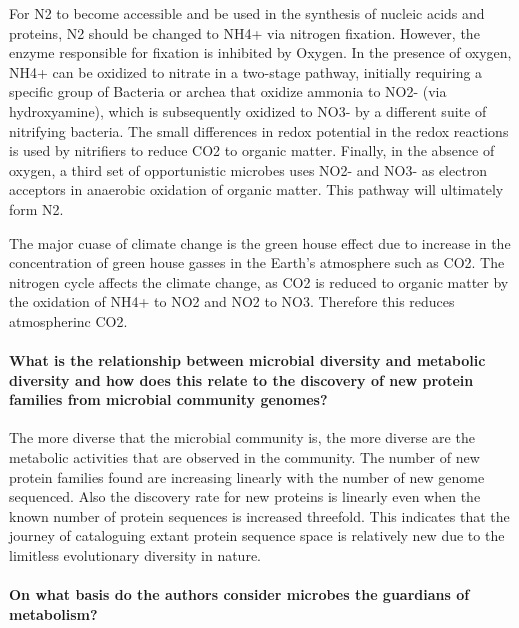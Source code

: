\documentclass[]{article}
\let\oldparagraph\paragraph
\renewcommand{\paragraph}[1]{\oldparagraph{#1}\mbox{}}
\begin{document}
For N2 to become accessible and be used in the synthesis of nucleic
acids and proteins, N2 should be changed to NH4+ via nitrogen fixation.
However, the enzyme responsible for fixation is inhibited by Oxygen. In
the presence of oxygen, NH4+ can be oxidized to nitrate in a two-stage
pathway, initially requiring a specific group of Bacteria or archea that
oxidize ammonia to NO2- (via hydroxyamine), which is subsequently
oxidized to NO3- by a different suite of nitrifying bacteria. The small
differences in redox potential in the redox reactions is used by
nitrifiers to reduce CO2 to organic matter. Finally, in the absence of
oxygen, a third set of opportunistic microbes uses NO2- and NO3- as
electron acceptors in anaerobic oxidation of organic matter. This
pathway will ultimately form N2.

The major cuase of climate change is the green house effect due to
increase in the concentration of green house gasses in the Earth's
atmosphere such as CO2. The nitrogen cycle affects the climate change,
as CO2 is reduced to organic matter by the oxidation of NH4+ to NO2 and
NO2 to NO3. Therefore this reduces atmospherinc CO2.

\paragraph{What is the relationship between microbial diversity and
metabolic diversity and how does this relate to the discovery of new
protein families from microbial community
genomes?}\label{what-is-the-relationship-between-microbial-diversity-and-metabolic-diversity-and-how-does-this-relate-to-the-discovery-of-new-protein-families-from-microbial-community-genomes}

The more diverse that the microbial community is, the more diverse are
the metabolic activities that are observed in the community. The number
of new protein families found are increasing linearly with the number of
new genome sequenced. Also the discovery rate for new proteins is
linearly even when the known number of protein sequences is increased
threefold. This indicates that the journey of cataloguing extant protein
sequence space is relatively new due to the limitless evolutionary
diversity in nature.

\paragraph{On what basis do the authors consider microbes the guardians
of
metabolism?}\label{on-what-basis-do-the-authors-consider-microbes-the-guardians-of-metabolism}
\end{document}
